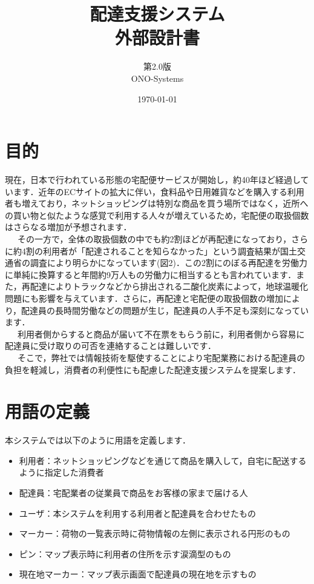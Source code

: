 \documentclass[a4j,titlepage]{jarticle}
\title{\huge 配達支援システム\\
		外部設計書}
\author{第2.0版\\
        ONO-Systems\\}
\date{\today}
\begin{document}
\maketitle

\tableofcontents
\clearpage

\section{目的}
現在，日本で行われている形態の宅配便サービスが開始し，約40年ほど経過しています．近年のECサイトの拡大に伴い，食料品や日用雑貨などを購入する利用者も増えており，ネットショッピングは特別な商品を買う場所ではなく，近所への買い物と似たような感覚で利用する人々が増えているため，宅配便の取扱個数はさらなる増加が予想されます\cite{ref1}．\\
\ \ \ その一方で，全体の取扱個数の中でも約2割ほどが再配達になっており，さらに約4割の利用者が「配達されることを知らなかった」という調査結果が国土交通省の調査により明らかになっています(図2)．この2割にのぼる再配達を労働力に単純に換算すると年間約9万人もの労働力に相当するとも言われています．また，再配達によりトラックなどから排出される二酸化炭素によって，地球温暖化問題にも影響を与えています．さらに，再配達と宅配便の取扱個数の増加により，配達員の長時間労働などの問題が生じ，配達員の人手不足も深刻になっています\cite{ref1}．\\
\ \ \ 利用者側からすると商品が届いて不在票をもらう前に，利用者側から容易に配達員に受け取りの可否を連絡することは難しいです．\\
\ \ \ そこで，弊社では情報技術を駆使することにより宅配業務における配達員の負担を軽減し，消費者の利便性にも配慮した配達支援システムを提案します．

\section{用語の定義}
本システムでは以下のように用語を定義します．
\begin{itemize}
 \item 利用者：ネットショッピングなどを通じて商品を購入して，自宅に配送するように指定した消費者
 \item 配達員：宅配業者の従業員で商品をお客様の家まで届ける人
 \item ユーザ：本システムを利用する利用者と配達員を合わせたもの
 \item マーカー：荷物の一覧表示時に荷物情報の左側に表示される円形のもの
 \item ピン：マップ表示時に利用者の住所を示す涙滴型のもの
 \item 現在地マーカー：マップ表示画面で配達員の現在地を示すもの
\end{itemize}
\end{document}
